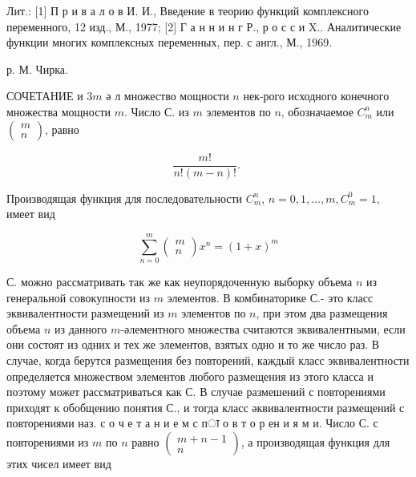 \documentclass[10pt]{article}
\begin{document}
Лит.: [1] П р и в а л о в И. И., Введение в теорию функций комплексного переменного, 12 изд., М., 1977; [2] Г а н н и н г Р., р о с с и X.. Аналитические функции многих комплексных переменных, пер. с англ., М., 1969.

р. М. Чирка.



СОЧЕТАНИЕ и $3 m$ ә л множество мощности $n$ нек-рого исходного конечного множества мощности $m$. Число С. из $m$ элементов по $n$, обозначаемое $C_{m}^{n}$ или $\left(\begin{array}{l}m \\ n\end{array}\right)$, равно



\[

\frac{m !}{n !(m-n) !} \text {. }

\]



Производящая функция для последовательности $C_{m}^{n}$, $n=0,1, \ldots, m, C_{m}^{0}=1$, имеет вид



\[

\sum_{n=0}^{m}\left(\begin{array}{l}

m \\

n

\end{array}\right) x^{n}=(1+x)^{m}

\]



С. можно рассматривать так же как неупорядоченную выборку объема $n$ из генеральной совокупности из $m$ элементов. В комбинаторике С.- это класс эквивалентности размещений из $m$ элементов по $n$, при этом два размещения объема $n$ из данного $m$-әлементного множества считаются эквивалентными, если они состоят из одних и тех же элементов, взятых одно и то же число раз. В случае, когда берутся размещения без повторений, каждый класс эквивалентности определяется множеством элементов любого размещения из этого класса и поэтому может рассматриваться как С. В случае размешений с повторениями приходят к обобщению понятия С., и тогда класс әквивалентности размещений с повторениями наз. с о ч е т а н и е м с пा о в т о р ен и я м и. Число С. с повторениями из $m$ по $n$ равно $\left(\begin{array}{c}m+n-1 \\ n\end{array}\right)$, а производящая функция для этих чисел имеет вид
\end{document}
